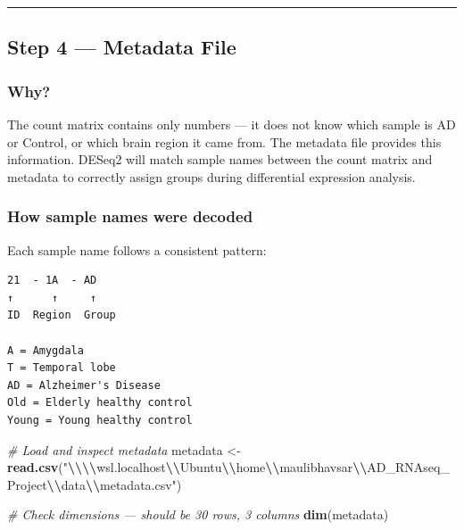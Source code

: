\documentclass[
]{article}
\newenvironment{Shaded}{\begin{snugshade}}{\end{snugshade}}
\newcommand{\CommentTok}[1]{\textcolor[rgb]{0.56,0.35,0.01}{\textit{#1}}}
\newcommand{\FunctionTok}[1]{\textcolor[rgb]{0.13,0.29,0.53}{\textbf{#1}}}
\newcommand{\NormalTok}[1]{#1}
\newcommand{\OtherTok}[1]{\textcolor[rgb]{0.56,0.35,0.01}{#1}}
\newcommand{\SpecialCharTok}[1]{\textcolor[rgb]{0.81,0.36,0.00}{\textbf{#1}}}
\newcommand{\StringTok}[1]{\textcolor[rgb]{0.31,0.60,0.02}{#1}}
\begin{document}
\begin{center}\rule{0.5\linewidth}{0.5pt}\end{center}

\subsection{Step 4 --- Metadata File}\label{step-4-metadata-file}

\subsubsection{Why?}\label{why-2}

The count matrix contains only numbers --- it does not know which sample
is AD or Control, or which brain region it came from. The metadata file
provides this information. DESeq2 will match sample names between the
count matrix and metadata to correctly assign groups during differential
expression analysis.

\subsubsection{How sample names were
decoded}\label{how-sample-names-were-decoded}

Each sample name follows a consistent pattern:

\begin{verbatim}
21  - 1A  - AD
↑      ↑     ↑
ID  Region  Group

A = Amygdala
T = Temporal lobe
AD = Alzheimer's Disease
Old = Elderly healthy control
Young = Young healthy control
\end{verbatim}

\begin{Shaded}
\begin{Highlighting}[]
\CommentTok{\# Load and inspect metadata}
\NormalTok{metadata }\OtherTok{\textless{}{-}} \FunctionTok{read.csv}\NormalTok{(}\StringTok{"}\SpecialCharTok{\textbackslash{}\textbackslash{}\textbackslash{}\textbackslash{}}\StringTok{wsl.localhost}\SpecialCharTok{\textbackslash{}\textbackslash{}}\StringTok{Ubuntu}\SpecialCharTok{\textbackslash{}\textbackslash{}}\StringTok{home}\SpecialCharTok{\textbackslash{}\textbackslash{}}\StringTok{maulibhavsar}\SpecialCharTok{\textbackslash{}\textbackslash{}}\StringTok{AD\_RNAseq\_Project}\SpecialCharTok{\textbackslash{}\textbackslash{}}\StringTok{data}\SpecialCharTok{\textbackslash{}\textbackslash{}}\StringTok{metadata.csv"}\NormalTok{)}

\CommentTok{\# Check dimensions — should be 30 rows, 3 columns}
\FunctionTok{dim}\NormalTok{(metadata)}
\end{Highlighting}
\end{Shaded}
\end{document}
